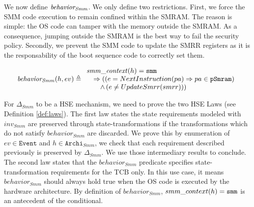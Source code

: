 We now define $\mathit{behavior_{Smm}}$. We only define two
restrictions. First, we force the SMM code execution to remain confined within
the SMRAM. The reason is simple: the OS code can tamper with the memory outside
the SMRAM. As a consequence, jumping outside the SMRAM is the best way to fail
the security policy. Secondly, we prevent the SMM code to update the SMRR
registers as it is the responsability of the boot sequence code to correctly set
them.

\[
  \mathit{behavior_{Smm}}(h, ev) \triangleq \begin{array}{l}
                                           \mathit{smm\_context}(h) = \mathtt{smm} \\
                                           \quad \Rightarrow ((e =
                                           NextInstruction(pa)
                                           \Rightarrow pa \in \texttt{pSmram}) \\
                                           \qquad \wedge\,(e \neq UpdateSmrr(smrr))) \\
                                         \end{array}
                                       \]

                                       For $\Delta_{Smm}$ to be a HSE mechanism,
                                       we need to prove the two HSE Laws (see
                                       Definition \ref{def:laws}).  The first
                                       law states the state requirements modeled
                                       with $inv_{Smm}$ are preserved through
                                       state-transformations if the
                                       transformations which do not satisfy
                                       $behavior_{Smm}$ are discarded. We prove
                                       this by enumeration of
                                       $ev \in \texttt{Event}$ and
                                       $h \in \texttt{Archi}_{Smm}$, we check
                                       that each requirement described
                                       previously is preserved by
                                       $\Delta_{Smm}$. We use those intermediary
                                       results to conclude. The second law
                                       states that the $behavior_{Smm}$
                                       predicate specifies
                                       state-trans\-formation requirements for
                                       the TCB only. In this use case, it means
                                       $behavior_{Smm}$ should always hold true
                                       when the OS code is executed by the
                                       hardware architecture.  By definition of
                                       $behavior_{Smm}$,
                                       $smm\_context(h) = \mathtt{smm}$ is an
                                       antecedent of the conditional.

